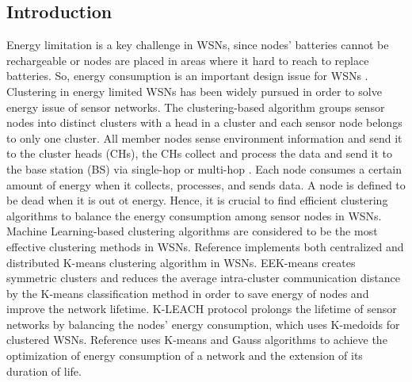 \documentclass[11pt]{report}
\begin{document}
	\subsection{Introduction}
	
	Energy limitation is a key challenge in WSNs, since nodes' batteries cannot be rechargeable or nodes are placed in areas where it hard to reach to replace batteries. So, energy consumption is an important design issue for WSNs \cite{7539358}. Clustering in energy limited WSNs has been widely pursued in order to solve energy issue of sensor networks. The clustering-based algorithm groups sensor nodes into distinct clusters with a head in a cluster and each sensor node belongs to only one cluster. All member nodes sense environment information and send it to the cluster heads (CHs), the CHs collect and process the data and send it to the base station (BS) via single-hop or multi-hop \cite{7855660}. Each node consumes a certain amount of energy when it collects, processes, and sends data. A node is defined to be dead when it is out ot energy\cite{8632891}. Hence, it is crucial to find efficient clustering algorithms to balance the energy consumption among sensor nodes in WSNs.\\
	
	\noindent Machine Learning-based clustering algorithms are considered to be the most effective clustering methods in WSNs. Reference \cite{6375088} implements both centralized and distributed K-means clustering algorithm in WSNs. EEK-means\cite{quchan2016towards} creates symmetric clusters and reduces the average intra-cluster communication distance by the K-means classification method in order to save energy of nodes and improve the network lifetime.  K-LEACH protocol \cite{Sangameswaran}  prolongs the lifetime of sensor networks by balancing the nodes' energy consumption, which uses K-medoids for clustered WSNs. Reference  \cite{rabiaa2015improvements} uses K-means and Gauss algorithms to achieve the optimization of energy consumption of a network and the extension of its duration of life. 
	\\
	
\end{document}
